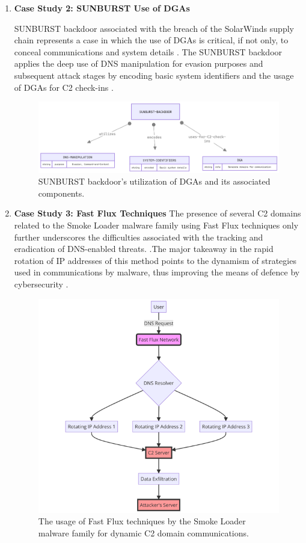 \begin{enumerate}
\item\textbf{ Case Study 2: SUNBURST Use of DGAs}

SUNBURST backdoor associated with the breach of the SolarWinds supply chain represents a case in which the use of DGAs is critical, if not only, to conceal communications and system details \cite{paloaltonetworks2021dnsattacks}. The SUNBURST backdoor applies the deep use of DNS manipulation for evasion purposes and subsequent attack stages by encoding basic system identifiers and the usage of DGAs for C2 check-ins \cite{unit42_solarstorm_2021}.

\captionsetup{font= footnotesize}
\begin{figure}[H] 
    \centering
    \includegraphics[width=0.8\linewidth]{background/SUNDNS.png}
    \caption{SUNBURST backdoor's utilization of DGAs and its associated components.}
    \label{fig:figEleven}
\end{figure}

\item\textbf{ Case Study 3: Fast Flux Techniques}
The presence of several C2 domains related to the Smoke Loader malware family using Fast Flux techniques only further underscores the difficulties associated with the tracking and eradication of DNS-enabled threats. \cite{paloaltonetworks2021dnsattacks}.The major takeaway in the rapid rotation of IP addresses of this method points to the dynamism of strategies used in communications by malware, thus improving the means of defence by cybersecurity \cite{unit42_fastflux_2021}.

\captionsetup{font= footnotesize}
\begin{figure}[H]
    \centering
    \includegraphics[width=0.8\linewidth]{background/FastFluDNS.png}
    \caption{The usage of Fast Flux techniques by the Smoke Loader malware family for dynamic C2 domain communications.}
    \label{fig:figTweleve}
\end{figure}



\end{enumerate}
